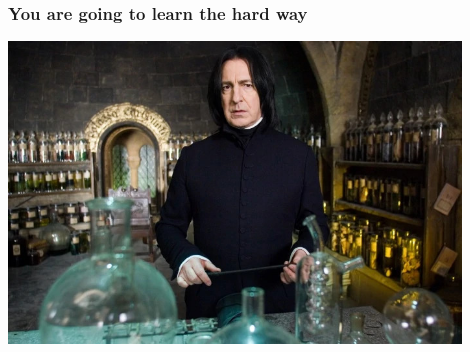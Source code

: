 \documentclass[10pt]{beamer}
\begin{document}
{
\begin{frame}
  \frametitle{\color{white} You are going to learn the \textbf{hard} way}

  \centering
  \includegraphics[height=8cm]{severus.jpg}
\end{frame}
}

\end{document}
